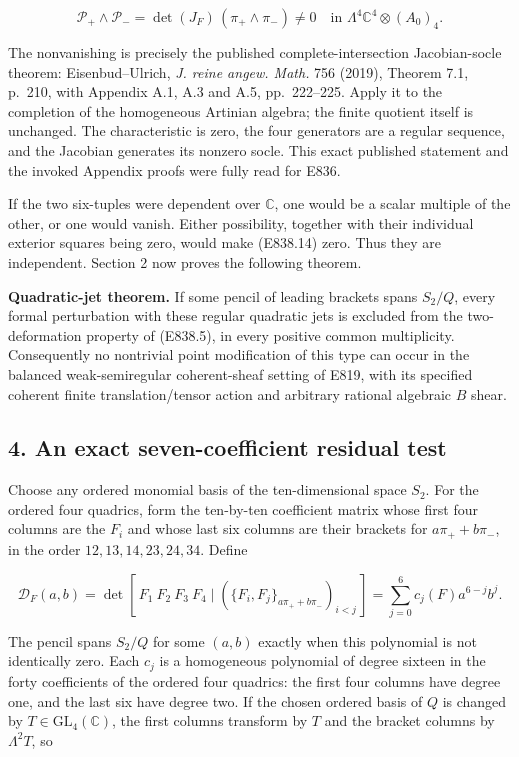 \[
 \mathcal P_+\wedge\mathcal P_-
       =\det(J_F)\,(\pi_+\wedge\pi_-)\ne0
       \quad\text{in }\Lambda^4\mathbb C^4\otimes(A_0)_4.
 \tag{E838.14}
\]

The nonvanishing is precisely the published complete-intersection
Jacobian-socle theorem: Eisenbud--Ulrich, \emph{J. reine angew. Math.}
756 (2019), Theorem 7.1, p.~210, with Appendix A.1, A.3 and A.5,
pp.~222--225.\cite{SFEisenbudUlrich2019} Apply it to the completion of the homogeneous Artinian
algebra; the finite quotient itself is unchanged. The characteristic is
zero, the four generators are a regular sequence, and the Jacobian
generates its nonzero socle. This exact published statement and the
invoked Appendix proofs were fully read for E836.

If the two six-tuples were dependent over \(\mathbb C\), one would be a
scalar multiple of the other, or one would vanish. Either possibility,
together with their individual exterior squares being zero, would make
(E838.14) zero. Thus they are independent. Section 2 now proves the
following theorem.

\textbf{Quadratic-jet theorem.} If some pencil of leading brackets spans
\(S_2/Q\), every formal perturbation with these regular quadratic jets
is excluded from the two-deformation property of (E838.5), in every
positive common multiplicity. Consequently no nontrivial point
modification of this type can occur in the balanced weak-semiregular
coherent-sheaf setting of E819, with its specified coherent finite
translation/tensor action and arbitrary rational algebraic \(B\) shear.

\subsection{4. An exact seven-coefficient residual
test}\label{SF-E838:an-exact-seven-coefficient-residual-test}

Choose any ordered monomial basis of the ten-dimensional space \(S_2\).
For the ordered four quadrics, form the ten-by-ten coefficient matrix
whose first four columns are the \(F_i\) and whose last six columns are
their brackets for \(a\pi_++b\pi_-\), in the order
\(12,13,14,23,24,34\). Define

\[
 \mathcal D_F(a,b)
   =\det[\,F_1\ F_2\ F_3\ F_4\mid
       (\{F_i,F_j\}_{a\pi_++b\pi_-})_{i<j}\,]
   =\sum_{j=0}^{6}c_j(F)a^{6-j}b^j.
 \tag{E838.15}
\]

The pencil spans \(S_2/Q\) for some \((a,b)\) exactly when this
polynomial is not identically zero. Each \(c_j\) is a homogeneous
polynomial of degree sixteen in the forty coefficients of the ordered
four quadrics: the first four columns have degree one, and the last six
have degree two. If the chosen ordered basis of \(Q\) is changed by
\(T\in\mathrm{GL}_4(\mathbb C)\), the first columns transform by \(T\)
and the bracket columns by \(\Lambda^2T\), so

